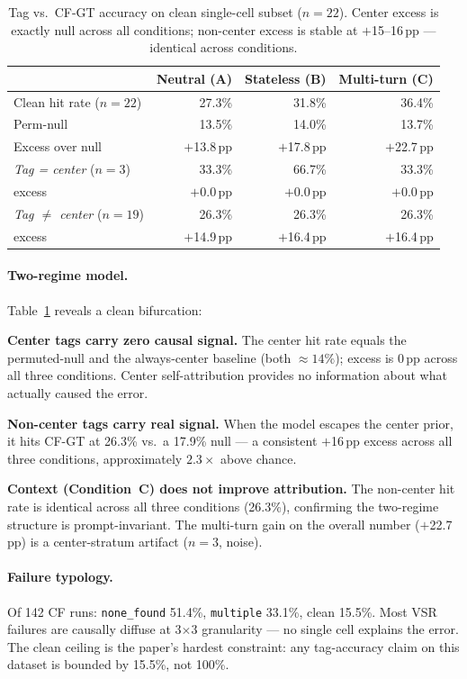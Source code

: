 \documentclass[11pt]{article}
\begin{document}
\begin{table}[t]
\centering
\small
\begin{tabular}{lrrr}
\toprule
 & Neutral (A) & Stateless (B) & Multi-turn (C) \\
\midrule
Clean hit rate ($n{=}22$) & 27.3\% & 31.8\% & 36.4\% \\
Perm-null & 13.5\% & 14.0\% & 13.7\% \\
Excess over null & $+$13.8\,pp & $+$17.8\,pp & $+$22.7\,pp \\
\midrule
\emph{Tag = center} ($n{=}3$) & 33.3\% & 66.7\% & 33.3\% \\
excess & $+$0.0\,pp & $+$0.0\,pp & $+$0.0\,pp \\
\emph{Tag $\neq$ center} ($n{=}19$) & 26.3\% & 26.3\% & 26.3\% \\
excess & $+$14.9\,pp & $+$16.4\,pp & $+$16.4\,pp \\
\bottomrule
\end{tabular}
\caption{Tag vs.\ CF-GT accuracy on clean single-cell subset ($n{=}22$).
Center excess is exactly null across all conditions; non-center excess is
stable at $+$15--16\,pp — identical across conditions.}
\label{tab:cf}
\end{table}

\paragraph{Two-regime model.}
Table~\ref{tab:cf} reveals a clean bifurcation:

\textbf{Center tags carry zero causal signal.}
The center hit rate equals the permuted-null and the always-center baseline
(both ${\approx}14\%$); excess is 0\,pp across all three conditions.
Center self-attribution provides no information about what actually caused the error.

\textbf{Non-center tags carry real signal.}
When the model escapes the center prior, it hits CF-GT at 26.3\% vs.\ a
17.9\% null — a consistent $+$16\,pp excess across all three conditions,
approximately $2.3\times$ above chance.

\textbf{Context (Condition~C) does not improve attribution.}
The non-center hit rate is identical across all three conditions (26.3\%),
confirming the two-regime structure is prompt-invariant.
The multi-turn gain on the overall number ($+$22.7\,pp) is a center-stratum
artifact ($n{=}3$, noise).

\paragraph{Failure typology.}
Of 142 CF runs: \texttt{none\_found} 51.4\%, \texttt{multiple} 33.1\%,
clean 15.5\%.
Most VSR failures are causally diffuse at 3$\times$3 granularity — no single
cell explains the error.
The clean ceiling is the paper's hardest constraint: any tag-accuracy claim on
this dataset is bounded by 15.5\%, not 100\%.
\end{document}
